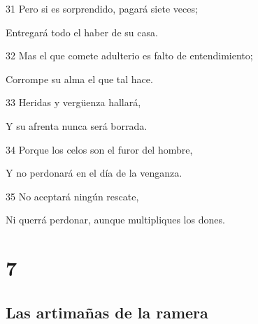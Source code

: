 \par 31 Pero si es sorprendido, pagará siete veces;
\par Entregará todo el haber de su casa.
\par 32 Mas el que comete adulterio es falto de entendimiento;
\par Corrompe su alma el que tal hace.
\par 33 Heridas y vergüenza hallará,
\par Y su afrenta nunca será borrada.
\par 34 Porque los celos son el furor del hombre,
\par Y no perdonará en el día de la venganza.
\par 35 No aceptará ningún rescate,
\par Ni querrá perdonar, aunque multipliques los dones.

\chapter{7}

\section*{Las artimañas de la ramera}

